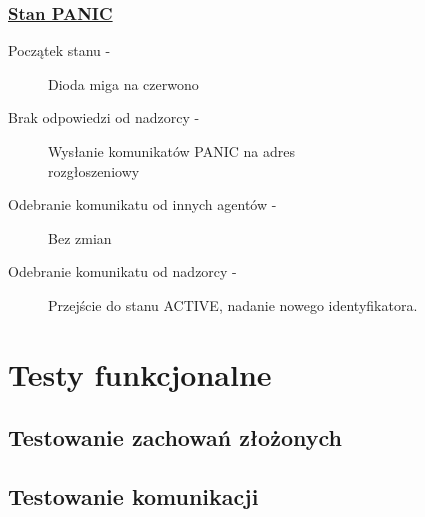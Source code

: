 \subsubsection{\underline{Stan PANIC}}

\begin{description}
    \item[Początek stanu -]Dioda miga na czerwono
    \item[Brak odpowiedzi od nadzorcy -]Wysłanie komunikatów PANIC na adres\\rozgłoszeniowy
    \item[Odebranie komunikatu od innych agentów -]Bez zmian
    \item[Odebranie komunikatu od nadzorcy -]Przejście do stanu ACTIVE, nadanie nowego identyfikatora.
\end{description}


\section{Testy funkcjonalne}


\subsection{Testowanie zachowań złożonych}

\subsection{Testowanie komunikacji}

